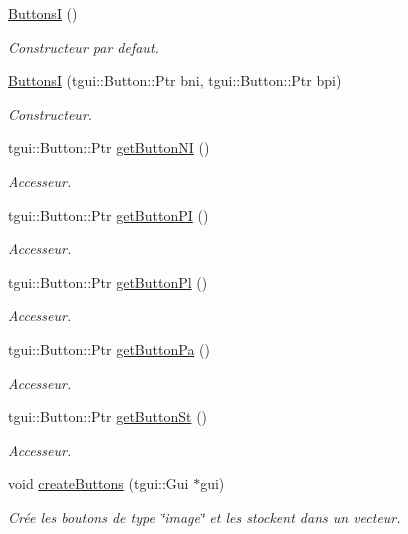 \begin{DoxyCompactItemize}
\item 
\hypertarget{classButtonsI_aa6a67085a5c6e454cb2bc4c4fb0d5e61}{\hyperlink{classButtonsI_aa6a67085a5c6e454cb2bc4c4fb0d5e61}{Buttons\+I} ()}\label{classButtonsI_aa6a67085a5c6e454cb2bc4c4fb0d5e61}

\begin{DoxyCompactList}\small\item\em Constructeur par defaut. \end{DoxyCompactList}\item 
\hyperlink{classButtonsI_add8708005f41ef4fac952c8a82dda809}{Buttons\+I} (tgui\+::\+Button\+::\+Ptr bni, tgui\+::\+Button\+::\+Ptr bpi)
\begin{DoxyCompactList}\small\item\em Constructeur. \end{DoxyCompactList}\item 
tgui\+::\+Button\+::\+Ptr \hyperlink{classButtonsI_aecda6d6e3e44514421942ebe655eed79}{get\+Button\+N\+I} ()
\begin{DoxyCompactList}\small\item\em Accesseur. \end{DoxyCompactList}\item 
tgui\+::\+Button\+::\+Ptr \hyperlink{classButtonsI_a0d59693afaa2c3c01952b37dc42aeb0d}{get\+Button\+P\+I} ()
\begin{DoxyCompactList}\small\item\em Accesseur. \end{DoxyCompactList}\item 
tgui\+::\+Button\+::\+Ptr \hyperlink{classButtonsI_a77f7974ed70abfc6fbfc601a15ef1b61}{get\+Button\+Pl} ()
\begin{DoxyCompactList}\small\item\em Accesseur. \end{DoxyCompactList}\item 
tgui\+::\+Button\+::\+Ptr \hyperlink{classButtonsI_a312da091b65cf79a9963590af5076d18}{get\+Button\+Pa} ()
\begin{DoxyCompactList}\small\item\em Accesseur. \end{DoxyCompactList}\item 
tgui\+::\+Button\+::\+Ptr \hyperlink{classButtonsI_a66e442c75b0110fdd73be6c7d8ea7b19}{get\+Button\+St} ()
\begin{DoxyCompactList}\small\item\em Accesseur. \end{DoxyCompactList}\item 
void \hyperlink{classButtonsI_ae79aa6a17f1251f34bffa009fcc0a2cd}{create\+Buttons} (tgui\+::\+Gui $\ast$gui)
\begin{DoxyCompactList}\small\item\em Crée les boutons de type \char`\"{}image\char`\"{} et les stockent dans un vecteur. \end{DoxyCompactList}\end{DoxyCompactItemize}


